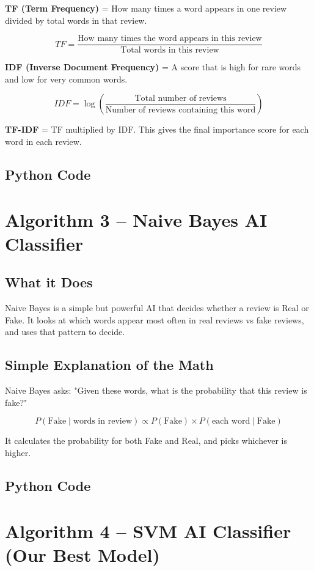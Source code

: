 \documentclass[10pt, a4paper]{report}
\begin{document}
\textbf{TF (Term Frequency)} = How many times a word appears in one review divided by total words in that review.

\[
TF = \frac{\text{How many times the word appears in this review}}{\text{Total words in this review}}
\]

\textbf{IDF (Inverse Document Frequency)} = A score that is high for rare words and low for very common words.

\[
IDF = \log\left(\frac{\text{Total number of reviews}}{\text{Number of reviews containing this word}}\right)
\]

\textbf{TF-IDF} = TF multiplied by IDF. This gives the final importance score for each word in each review.

\subsection{Python Code}

\section{Algorithm 3 -- Naive Bayes AI Classifier}

\subsection{What it Does}

Naive Bayes is a simple but powerful AI that decides whether a review is Real or Fake. It looks at which words appear most often in real reviews vs fake reviews, and uses that pattern to decide.

\subsection{Simple Explanation of the Math}

Naive Bayes asks: "Given these words, what is the probability that this review is fake?"

\[
P(\text{Fake} \mid \text{words in review}) \propto P(\text{Fake}) \times P(\text{each word} \mid \text{Fake})
\]

It calculates the probability for both Fake and Real, and picks whichever is higher.

\subsection{Python Code}

\section{Algorithm 4 -- SVM AI Classifier (Our Best Model)}
\end{document}
